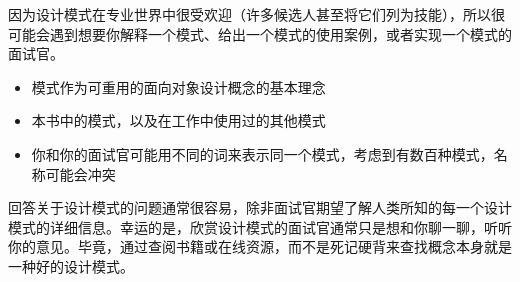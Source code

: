 
因为设计模式在专业世界中很受欢迎（许多候选人甚至将它们列为技能），所以很可能会遇到想要你解释一个模式、给出一个模式的使用案例，或者实现一个模式的面试官。


\begin{itemize}
\item
模式作为可重用的面向对象设计概念的基本理念

\item
本书中的模式，以及在工作中使用过的其他模式

\item
你和你的面试官可能用不同的词来表示同一个模式，考虑到有数百种模式，名称可能会冲突
\end{itemize}


回答关于设计模式的问题通常很容易，除非面试官期望了解人类所知的每一个设计模式的详细信息。幸运的是，欣赏设计模式的面试官通常只是想和你聊一聊，听听你的意见。毕竟，通过查阅书籍或在线资源，而不是死记硬背来查找概念本身就是一种好的设计模式。



